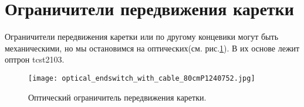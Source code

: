 \section{Ограничители передвижения каретки}
Ограничители передвижения каретки или по другому концевики могут быть механическими, но мы остановимся на оптических(см. рис.\ref{fig:optical_end}). В их основе лежит оптрон tcst2103.
\begin{figure}[ht]
	\centering
     \texttt{[image: optical\_endswitch\_with\_cable\_80cmP1240752.jpg]}
	\caption{Оптический ограничитель передвижения каретки.}
	\label{fig:optical_end}
\end{figure}